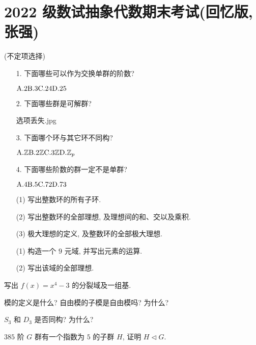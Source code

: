 \newpage
\section{2022 级数试抽象代数期末考试(回忆版, 张强)}

\problem[题目 1] (不定项选择)

\begin{itemize}
	\item[1.] 下面哪些可以作为交换单群的阶数?

	$\t A.2\hfil \t B. 3\hfil\t C. 24\hfil \t D.25$

	\item[2.] 下面哪些群是可解群?

	选项丢失.jpg

	\item[3.] 下面哪个环与其它环不同构?

	$\t A.\Z\hfil \t B. 2\Z\hfil\t C. 3\Z\hfil \t D.\Z_p$

	\item[4.] 下面哪些阶数的群一定不是单群?

	$\t A.4\hfil \t B. 5\hfil\t C. 72\hfil \t D.73$
\end{itemize}

\problem[题目 2]

\begin{itemize}
	\item[(1)] 写出整数环的所有子环.

	\item[(2)] 写出整数环的全部理想, 及理想间的和、交以及乘积.

	\item[(3)] 极大理想的定义, 及整数环的全部极大理想.
\end{itemize}

\problem[题目 3]

\begin{itemize}
	\item[(1)] 构造一个 $9$ 元域, 并写出元素的运算.

	\item[(2)] 写出该域的全部理想.
\end{itemize}

\problem[题目 4]写出 $f(x)=x^4-3$ 的分裂域及一组基.

\problem[题目 5] 模的定义是什么? 自由模的子模是自由模吗? 为什么?

\problem[题目 6] $S_3$ 和 $D_3$ 是否同构? 为什么?

\problem[题目 7] $385$ 阶 $G$ 群有一个指数为 $5$ 的子群 $H$, 证明 $H\lhd G$.

